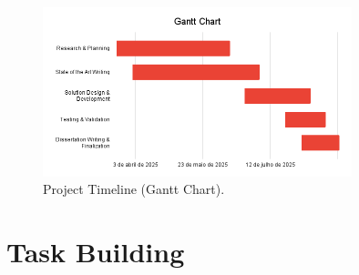  \begin{figure}[htbp]
  \centering
  \includegraphics[width=0.8\textwidth]{Chapters/Figures/GanttChart.png}
  \caption{Project Timeline (Gantt Chart).}
  \label{fig:GanttChart}
\end{figure}
 

\section{Task Building}
\label{sec:task_building}

